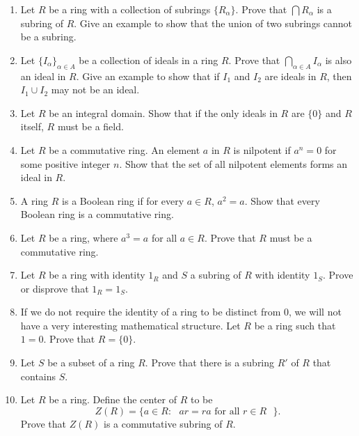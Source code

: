 {\begin{enumerate}
\begin{enumerate}
 \item
$r-s \in S$ for all $r, s \in S$.
 
\end{enumerate}
 
 
\item
Let $R$ be a ring with a collection of subrings $\{ R_{\alpha} \}$.
Prove that $\bigcap  R_{\alpha}$ is a subring of $R$.  Give an example
to show that the union of two subrings cannot be a subring.
 
 
\item
Let $\{ I_{\alpha} \}_{\alpha \in A}$ be a collection of ideals in a
ring $R$.  Prove that $\bigcap_{\alpha \in A} I_{\alpha}$ is also an
ideal in $R$. Give an example to show that if $I_1$ and $I_2$ are
ideals in $R$, then $I_1 \cup I_2$ may not be an ideal. 
 
 
\item
Let $R$ be an integral domain.  Show that if the only ideals in $R$ 
are $\{ 0 \}$ and $R$ itself, $R$ must be a field. 
 
 
\item
Let $R$ be a commutative ring.  An element $a$ in $R$ is {\bfi
nilpotent\/} if $a^n =
0$ for some positive integer $n$. Show that the set of all nilpotent
elements forms an ideal in $R$.   
 
 
\item
A ring $R$ is a {\bfi Boolean
ring\/} if for every $a \in R$,
$a^2 = a$. Show that every Boolean ring is a commutative ring.
 
 
\item
Let $R$ be a ring, where $a^3 =a$ for all $a \in R$. Prove that $R$
must be a commutative ring. 
 
 
\item
Let $R$ be a ring with identity $1_R$ and $S$ a subring of $R$ with
identity $1_S$.  Prove or disprove that $1_R = 1_S$.
 
 
 
\item
If we do not require the identity of a ring to be distinct from 0, we
will not have a very interesting mathematical structure. Let $R$ be a
ring such that $1 = 0$. Prove that $R = \{ 0 \}$. 
 
 
\item
Let $S$ be a subset of a ring $R$.  Prove that there is a subring $R'$
of $R$ that contains $S$. 
 
 
\item
Let $R$ be a ring. Define the {\bfi center\/} of $R$ to be 
\[
Z(R) = \{ a \in R : \mbox{ $ar = ra$ for all $r \in R$ } \}.
\]
Prove that $Z(R)$ is a commutative subring of $R$.
 

\end{enumerate}}

